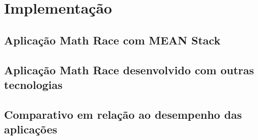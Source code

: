 \chapter{Implementação}	 
\label{implementacao}

\section{Aplicação Math Race com MEAN Stack}

\section{Aplicação Math Race  desenvolvido com outras tecnologias}

\section{Comparativo em relação ao desempenho  das aplicações}